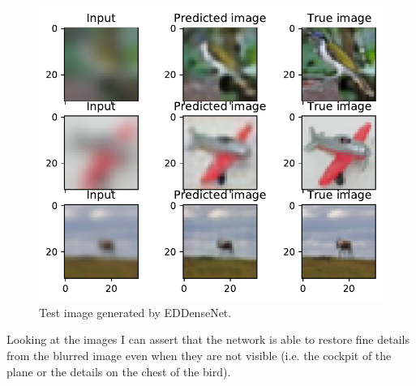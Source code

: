\begin{figure}[H]
    \centering
    \includegraphics[height=0.5\textheight,keepaspectratio]{subsections/densenet/test.pdf}
    \caption{Test image generated by EDDenseNet.}
\end{figure}

Looking at the images I can assert that the network is able to restore fine details from the blurred image even when they are not visible (i.e. the cockpit of the plane or the details on the chest of the bird).



